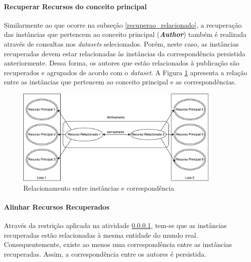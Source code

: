 \paragraph{Recuperar Recursos do conceito principal}
\label{recuperao_principal}

Similarmente ao que ocorre na subseção \ref{recuperao_relacionado}, a recuperação  das instâncias que pertencem ao conceito principal (\textbf{\textit{Author}}) também é realizada através de consultas nos \textit{datasets} selecionados. Porém, neste caso, as instâncias recuperadas devem estar relacionadas às instâncias da correspondência persistida anteriormente. Dessa forma, os autores que estão relacionados à publicação são recuperados e agrupados de acordo com o \textit{dataset}. A Figura \ref{fig:relacionados} apresenta a relação entre as instâncias que pertencem ao conceito principal e as correspondências.

\begin{figure}[!h]
	\centering
	\includegraphics[width=0.9\textwidth]{./imagens/relacionados.pdf}
	\caption{Relacionamento entre instâncias e correspondência}
	\label{fig:relacionados}
\end{figure}

\paragraph{Alinhar Recursos Recuperados}

Através da restrição aplicada na atividade \ref{recuperao_principal}, tem-se que as instâncias recuperadas estão relacionadas à mesma entidade do mundo real. Consequentemente, existe ao menos uma correspondência entre as instâncias recuperadas. Assim, a correspondência entre os autores é persistida. 
% 
% 
%
%
